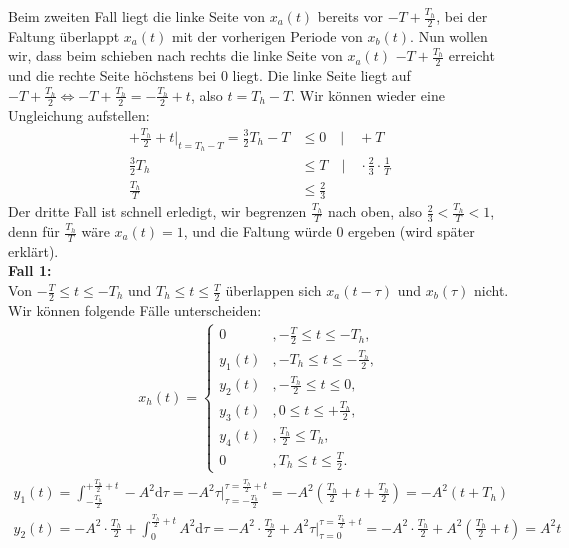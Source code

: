 \documentclass[11pt,a4paper,DIV=12]{scrartcl}
\newcommand{\diff}{\mathrm{d}}
\begin{document}
Beim zweiten Fall liegt die linke Seite von $x_{a}(t)$ bereits vor $-T+\frac{T_h}{2}$, bei der Faltung überlappt $x_{a}(t)$ mit der vorherigen Periode von $x_b(t)$. Nun wollen wir, dass beim schieben nach rechts die linke Seite von $x_{a}(t)$ $-T+\frac{T_h}{2}$ erreicht und die rechte Seite höchstens bei $0$ liegt. Die linke Seite liegt auf $-T+\frac{T_h}{2} \Leftrightarrow -T+\frac{T_h}{2}=-\frac{T_h}{2}+t$, also $t=T_h-T$. Wir können wieder eine Ungleichung aufstellen:
\begin{align}
	+\frac{T_h}{2}+t\Bigg |_{t=T_h-T}=\frac{3}{2}T_h-T&\leq 0\quad\Bigg |\quad+T\nonumber \\
	\frac{3}{2}T_h&\leq T\quad\Bigg | \quad\cdot\frac{2}{3}\cdot\frac{1}{T}\nonumber\\
	\frac{T_h}{T}&\leq \frac{2}{3}
\end{align}
Der dritte Fall ist schnell erledigt, wir begrenzen $\frac{T_h}{T}$ nach oben, also $\frac{2}{3}<\frac{T_h}{T}<1$, denn für $\frac{T_h}{T}$ wäre $x_a(t)=1$, und die Faltung würde $0$ ergeben (wird später erklärt).\\
\textbf{Fall 1:}\\
Von $-\frac{T}{2}\leq t \leq -T_h$ und $T_h \leq t \leq \frac{T}{2}$ überlappen sich $x_{a}(t-\tau)$ und $x_{b}(\tau)$ nicht.\\
Wir können folgende Fälle unterscheiden: \\
\begin{align}
	x_{h}(t)=\begin{cases}
		0 &, -\frac{T}{2}\leq t \leq -T_h, \\
		y_1(t) &,-T_h\leq t \leq -\frac{T_h}{2}, \\
		y_2(t) &, -\frac{T_h}{2} \leq t \leq 0, \\
		y_3(t) &, 0 \leq t \leq +\frac{T_h}{2}, \\
		y_4(t) &, \frac{T_h}{2}\leq T_h, \\
		0 &, T_h \leq t \leq \frac{T}{2}.
	\end{cases}
\end{align}
\begin{align}
	y_1(t)=\int_{-\frac{T_h}{2}}^{+\frac{T_h}{2}+t}-A^2\diff \tau = -A^2\tau \Bigg |_{\tau=-\frac{T_h}{2}}^{\tau=\frac{T_h}{2}+t}=-A^2(\frac{T_h}{2}+t+\frac{T_h}{2})=-A^2(t+T_h)
\end{align}
\begin{align}
	y_2(t)=-A^2\cdot\frac{T_h}{2}+\int_{0}^{\frac{T_h}{2}+t}A^2\diff \tau = -A^2\cdot\frac{T_h}{2}+A^2\tau\Bigg |_{\tau=0}^{\tau=\frac{T_h}{2}+t}=-A^2\cdot\frac{T_h}{2}+A^2(\frac{T_h}{2}+t)=A^2t
\end{align}
\end{document}
